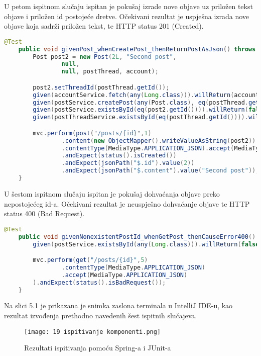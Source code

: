 			U petom ispitnom slučaju ispitan je pokušaj izrade nove objave uz priložen tekst objave i priložen id postojeće dretve. Očekivani rezultat je uspješna izrada nove objave koja sadrži priložen tekst, te HTTP status 201 (Created).

			\begin{lstlisting}[language=Java, breaklines=true]
    @Test
    public void givenPost_whenCreatePost_thenReturnPostAsJson() throws Exception {
        Post post2 = new Post(2L, "Second post",
                null,
                null, postThread, account);

        post2.setThreadId(postThread.getId());
        given(accountService.fetch(any(Long.class))).willReturn(account);
        given(postService.createPost(any(Post.class), eq(postThread.getId()))).willReturn(post2);
        given(postService.existsById(eq(post2.getId()))).willReturn(false);
        given(postThreadService.existsById(eq(postThread.getId()))).willReturn(true);

        mvc.perform(post("/posts/{id}",1)
                .content(new ObjectMapper().writeValueAsString(post2))
                .contentType(MediaType.APPLICATION_JSON).accept(MediaType.APPLICATION_JSON))
                .andExpect(status().isCreated())
                .andExpect(jsonPath("$.id").value(2))
                .andExpect(jsonPath("$.content").value("Second post"));
    }
			\end{lstlisting}

			U šestom ispitnom slučaju ispitan je pokušaj dohvaćanja objave preko nepostojećeg id-a.
			Očekivani rezultat je neuspješno dohvaćanje objave te HTTP status 400 (Bad Request).

			\begin{lstlisting}[language=Java, breaklines=true]
    @Test
    public void givenNonexistentPostId_whenGetPost_thenCauseError400() throws Exception {
        given(postService.existsById(any(Long.class))).willReturn(false);

        mvc.perform(get("/posts/{id}",5)
                .contentType(MediaType.APPLICATION_JSON)
                .accept(MediaType.APPLICATION_JSON)
        ).andExpect(status().isBadRequest());
    }
			\end{lstlisting}

			Na slici 5.1 je prikazana je snimka zaslona terminala u IntelliJ IDE-u, kao rezultat izvođenja prethodno navedenih šest ispitnih slučajeva.

			\begin{figure}[H]
					\centering
					\texttt{[image: 19 ispitivanje komponenti.png]}
					\caption{Rezultati ispitivanja pomoću Spring-a i JUnit-a}
				\end{figure}
			\eject

